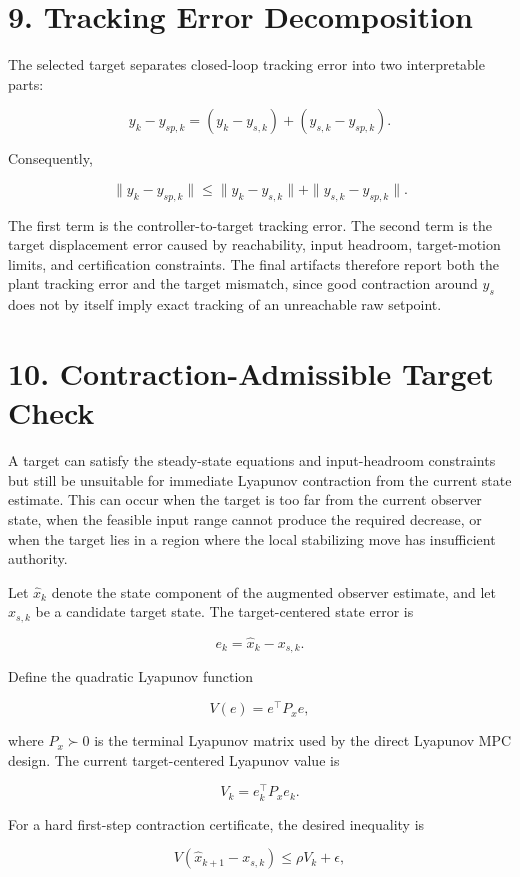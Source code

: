\documentclass[11pt]{article}
\begin{document}
\section*{9. Tracking Error Decomposition}

The selected target separates closed-loop tracking error into two interpretable parts:


\[
y_k-y_{sp,k}
=
(y_k-y_{s,k})
+
(y_{s,k}-y_{sp,k}).
\]

Consequently,


\[
\|y_k-y_{sp,k}\|
\le
\|y_k-y_{s,k}\|
+
\|y_{s,k}-y_{sp,k}\|.
\]

The first term is the controller-to-target tracking error. The second term is the target displacement error caused by reachability, input headroom, target-motion limits, and certification constraints. The final artifacts therefore report both the plant tracking error and the target mismatch, since good contraction around $y_s$ does not by itself imply exact tracking of an unreachable raw setpoint.


\section*{10. Contraction-Admissible Target Check}

A target can satisfy the steady-state equations and input-headroom constraints but still be unsuitable for immediate Lyapunov contraction from the current state estimate. This can occur when the target is too far from the current observer state, when the feasible input range cannot produce the required decrease, or when the target lies in a region where the local stabilizing move has insufficient authority.


Let $\hat x_k$ denote the state component of the augmented observer estimate, and let $x_{s,k}$ be a candidate target state. The target-centered state error is


\[
e_k=\hat x_k-x_{s,k}.
\]

Define the quadratic Lyapunov function


\[
V(e)=e^\top P_x e,
\]

where $P_x\succ 0$ is the terminal Lyapunov matrix used by the direct Lyapunov MPC design. The current target-centered Lyapunov value is


\[
V_k
=
e_k^\top P_x e_k.
\]

For a hard first-step contraction certificate, the desired inequality is


\[
V(\hat x_{k+1}-x_{s,k})
\le
\rho V_k+\epsilon,
\]
\end{document}

